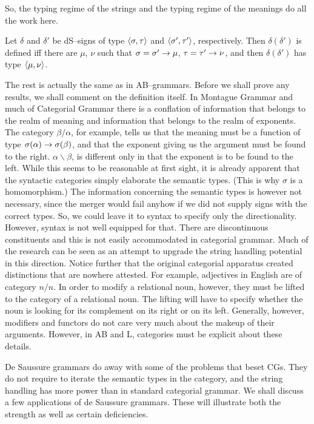 So, the typing regime of the strings and the typing regime of the
meanings do all the work here.
\begin{prop}
Let $\delta$ and $\delta'$ be dS--signs of type $\langle \sigma, \tau\rangle$
and $\langle \sigma',\tau'\rangle$, respectively. Then $\delta(\delta')$
is defined iff there are $\mu$, $\nu$ such that
$\sigma = \sigma' \rightarrow \mu$, $\tau = \tau' \rightarrow \nu$, and then
$\delta(\delta')$ has type $\langle \mu, \nu\rangle$.
\end{prop}
The rest is actually the same as in AB--grammars. Before we 
shall prove any results, we shall
comment on the definition itself. In Montague Grammar and much
of Categorial Grammar there is a conflation of information
that belongs to the realm of meaning and information that belongs
to the realm of exponents. The category $\beta/\alpha$, for example,
tells us that the meaning must be a function of type $\sigma(\alpha) 
\rightarrow \sigma(\beta)$, and that the exponent giving us the argument 
must be found to the right. $\alpha \backslash \beta$, is different
only in that the exponent is to be found to the left. While this
seems to be reasonable at first sight, it is already apparent
that the syntactic categories simply elaborate the semantic types.
(This is why $\sigma$ is a homomorphism.) The information
concerning the semantic types is however not necessary, since
the merger would fail anyhow if we did not supply signs with
the correct types. So, we could leave it to syntax to specify only
the directionality. However, syntax is not well equipped for that.
There are discontinuous constituents and this is not easily
accommodated in categorial grammar. Much of the research can be
seen as an attempt to upgrade the string handling potential in
this direction. Notice further that the original categorial
apparatus created distinctions that are nowhere attested.
For example, adjectives in English are of category $n/n$. In 
order to modify a relational noun, however, they must be
lifted to the category of a relational noun. The lifting will have
to specify whether the noun is looking for its complement on its
right or on its left. Generally, however, modifiers and functors
do not care very much about the makeup of their arguments. 
However, in \textsf{AB} and \textsf{L}, categories must be 
explicit about these details.

De Saussure grammars do away with some of the problems that beset 
CGs. They do not require to iterate the semantic types in the category, 
and the string handling has more power than in standard categorial 
grammar. We shall discuss a few applications of de Saussure grammars. 
These will illustrate both the strength as well as certain 
deficiencies.

